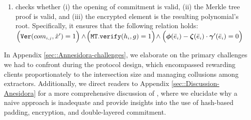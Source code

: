 \begin{enumerate}[leftmargin=4mm]
\begin{enumerate}
 \item\label{e-psi::SC-verification--check-three-vals} checks whether (i) the opening of commitment is valid,  (ii) the Merkle tree proof is valid, and (iii) the encrypted element is the resulting polynomial's root. Specifically, it ensures that the following relation holds: $\Big(\mathtt{Ver}(com_{\scriptscriptstyle i,j}, \hat{x}')=1\Big) \hspace{0mm} \wedge \hspace{-0.5mm} \Big(\mathtt{MT.verify}(h_{\scriptscriptstyle i},g)=1\Big) \hspace{-.5mm} \wedge \hspace{0mm}  \Big(\bm\phi( \bar{e}_{\scriptscriptstyle i})-\bm\zeta( \bar{e}_{\scriptscriptstyle i})\cdot \bm\gamma'( \bar{e}_{\scriptscriptstyle i})=0\Big)$




\end{enumerate}




\end{enumerate}


 \vspace{-3mm}
 In Appendix \ref{sec::Annesidora-challenges}, we elaborate on the primary challenges we had to confront during the protocol design, which encompassed rewarding clients proportionately to the intersection size and managing collusions among extractors. Additionally, we direct readers to Appendix \ref{sec::Discussion-Anesidora} for a more comprehensive discussion of \withRew, where we elucidate why a naive approach is inadequate and provide insights into the use of hash-based padding, encryption, and double-layered commitment.
 
